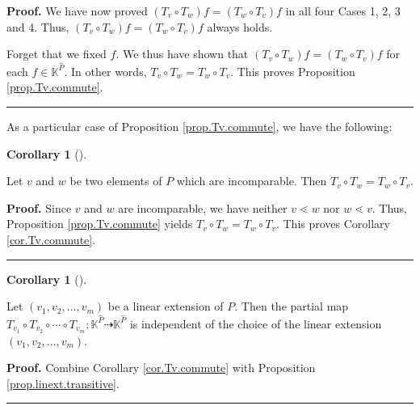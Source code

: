 \documentclass[numbers=enddot,12pt,final,onecolumn,notitlepage]{scrartcl}%
\theoremstyle{definition}
\newtheorem{coro}[theo]{Corollary}
\newenvironment{corollary}[1][]
{\begin{coro}[#1]\begin{leftbar}}
{\end{leftbar}\end{coro}}
\newenvironment{verlong}{}{}
\newenvironment{vershort}{}{}
\newenvironment{proof}[1][Proof]{\noindent\textbf{#1.} }{\ \rule{0.5em}{0.5em}}
\begin{document}
\begin{verlong}
\begin{proof}
We have now proved $\left(  T_{v}\circ T_{w}\right)  f=\left(  T_{w}\circ
T_{v}\right)  f$ in all four Cases 1, 2, 3 and 4. Thus, $\left(  T_{v}\circ
T_{w}\right)  f=\left(  T_{w}\circ T_{v}\right)  f$ always holds.

Forget that we fixed $f$. We thus have shown that $\left(  T_{v}\circ
T_{w}\right)  f=\left(  T_{w}\circ T_{v}\right)  f$ for each $f\in
\mathbb{K}^{\widehat{P}}$. In other words, $T_{v}\circ T_{w}=T_{w}\circ T_{v}%
$. This proves Proposition \ref{prop.Tv.commute}.
\end{proof}
\end{verlong}

As a particular case of Proposition \ref{prop.Tv.commute}, we have the following:

\begin{corollary}
\label{cor.Tv.commute}Let $v$ and $w$ be two elements of $P$ which are
incomparable. Then $T_{v}\circ T_{w}=T_{w}\circ T_{v}$.
\end{corollary}

\begin{verlong}


\begin{proof}
Since $v$ and $w$ are incomparable, we have neither $v\lessdot w$ nor
$w\lessdot v$. Thus, Proposition \ref{prop.Tv.commute} yields $T_{v}\circ
T_{w}=T_{w}\circ T_{v}$. This proves Corollary \ref{cor.Tv.commute}.
\end{proof}
\end{verlong}

\begin{corollary}
\label{cor.R.welldef}Let $\left(  v_{1},v_{2},\ldots,v_{m}\right)  $ be a
linear extension of $P$. Then the partial map $T_{v_{1}}\circ T_{v_{2}}%
\circ\cdots\circ T_{v_{m}}:\mathbb{K}^{\widehat{P}}\dashrightarrow
\mathbb{K}^{\widehat{P}}$ is independent of the choice of the linear extension
$\left(  v_{1},v_{2},\ldots,v_{m}\right)  $.
\end{corollary}

\begin{vershort}


\begin{proof}
Combine Corollary \ref{cor.Tv.commute} with Proposition
\ref{prop.linext.transitive}.
\end{proof}
\end{vershort}
\end{document}
